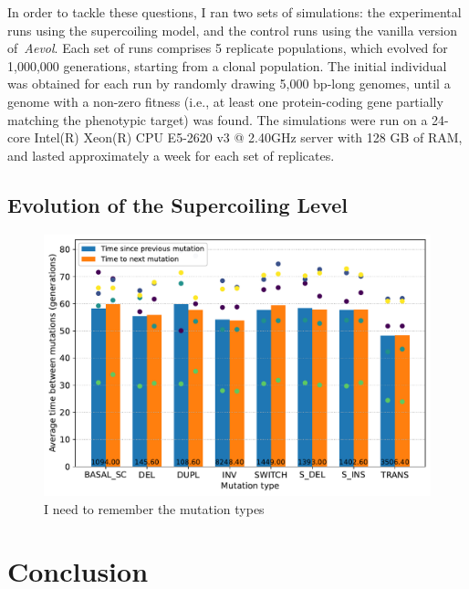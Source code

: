 In order to tackle these questions, I ran two sets of simulations: the experimental runs using the supercoiling model, and the control runs using the vanilla version of \emph{Aevol}.
Each set of runs comprises 5 replicate populations, which evolved for 1,000,000 generations, starting from a clonal population.
The initial individual was obtained for each run by randomly drawing 5,000 bp-long genomes, until a genome with a non-zero fitness (i.e., at least one protein-coding gene partially matching the phenotypic target) was found.
The simulations were run on a 24-core Intel(R) Xeon(R) CPU E5-2620 v3 @ 2.40GHz server with 128 GB of RAM, and lasted approximately a week for each set of replicates.

\subsection{Evolution of the Supercoiling Level}

\begin{figure}[H]
\includegraphics[width=\textwidth]{aevol/images/with_sc_mut_time_150k_995k.pdf}
\caption{I need to remember the mutation types}
\end{figure}


\section{Conclusion}
\label{sec:aevol:ccl}